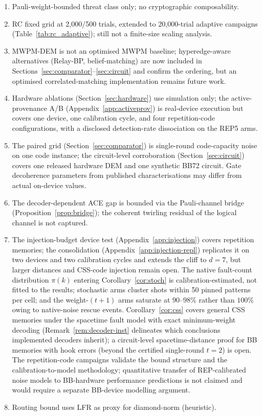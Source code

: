 \documentclass[11pt,a4paper]{article}
\begin{document}
\begin{enumerate}[leftmargin=1.4em]
  \item Pauli-weight-bounded threat class only; no cryptographic composability.
  \item RC fixed grid at 2{,}000/500 trials, extended to
    20{,}000-trial adaptive campaigns
    (Table~\ref{tab:rc_adaptive}); still not a finite-size scaling
    analysis.
  \item MWPM-DEM is not an optimised MWPM baseline; hyperedge-aware
    alternatives (Relay-BP, belief-matching) are now included in
    Sections~\ref{sec:comparator}--\ref{sec:circuit} and confirm the
    ordering, but an optimised correlated-matching implementation remains
    future work.
  \item Hardware ablations (Section~\ref{sec:hardware}) use simulation only;
    the active-provenance A/B (Appendix~\ref{app:activeprov}) is real-device
    execution but covers one device, one calibration cycle, and four
    repetition-code configurations, with a disclosed detection-rate
    dissociation on the REP5 arms.
  \item The paired grid (Section~\ref{sec:comparator}) is single-round
    code-capacity noise on one code instance; the circuit-level
    corroboration (Section~\ref{sec:circuit}) covers one released hardware
    DEM and one synthetic BB72 circuit. Gate decoherence parameters from
    published characterisations may differ from actual on-device values.
  \item The decoder-dependent ACE gap is bounded via the Pauli-channel
    bridge (Proposition~\ref{prop:bridge}); the coherent twirling
    residual of the logical channel is not captured.
  \item The injection-budget device test (Appendix~\ref{app:injection})
    covers repetition memories; the consolidation
    (Appendix~\ref{app:injection-repl}) replicates it on two devices and
    two calibration cycles and extends the cliff to $d{=}7$, but larger
    distances and CSS-code injection remain open. The native fault-count
    distribution $\pi(k)$ entering Corollary~\ref{cor:stoch} is
    calibration-estimated, not fitted to the results; stochastic arms
    cluster shots within 50 pinned patterns per cell; and the
    weight-$(t{+}1)$ arms saturate at $90$--$98\%$ rather than $100\%$
    owing to native-noise rescue events. Corollary~\ref{cor:css} covers general CSS memories under
    the spacetime fault model with exact minimum-weight decoding
    (Remark~\ref{rem:decoder-inst} delineates which conclusions
    implemented decoders inherit); a
    circuit-level spacetime-distance proof for BB memories with hook
    errors (beyond the certified single-round $t=2$) is open. The
    repetition-code campaigns
    validate the bound structure and the calibration-to-model
    methodology; quantitative transfer of REP-calibrated noise models
    to BB-hardware performance predictions is not claimed and would
    require a separate BB-device modelling argument.
  \item Routing bound uses LFR as proxy for diamond-norm (heuristic).
\end{enumerate}
\end{document}
